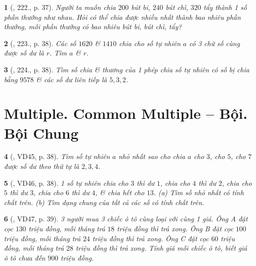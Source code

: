 \documentclass{article}
\newtheorem{baitoan}{}
\begin{document}
\begin{baitoan}[\cite{Binh_Toan_6_tap_1}, 222., p. 37]
	Người ta muốn chia $200$ bút bi, $240$ bút chì, $320$ tẩy thành 1 số phần thưởng như nhau. Hỏi có thể chia được nhiều nhất thành bao nhiêu phần thưởng, mỗi phần thưởng có bao nhiêu bút bi, bút chì, tẩy?
\end{baitoan}

\begin{baitoan}[\cite{Binh_Toan_6_tap_1}, 223., p. 38]
	Các số $1620$ \& $1410$ chia cho số tự nhiên $a$ có 3 chữ số cùng được số dư là $r$. Tìm $a$ \& $r$.
\end{baitoan}

\begin{baitoan}[\cite{Binh_Toan_6_tap_1}, 224., p. 38]
	Tìm số chia \& thương của 1 phép chia số tự nhiên có số bị chia bằng $9578$ \& các số dư liên tiếp là $5,3,2$.
\end{baitoan}


\section{Multiple. Common Multiple -- Bội. Bội Chung}

\begin{baitoan}[\cite{Binh_Toan_6_tap_1}, VD45, p. 38]
	Tìm số tự nhiên $a$ nhỏ nhất sao cho chia $a$ cho $3$, cho $5$, cho $7$ được số dư theo thứ tự là $2,3,4$.
\end{baitoan}

\begin{baitoan}[\cite{Binh_Toan_6_tap_1}, VD46, p. 38]
	1 số tự nhiên chia cho $3$ thì dư $1$, chia cho $4$ thì dư $2$, chia cho $5$ thì dư $3$, chia cho $6$ thì dư $4$, \& chia hết cho $13$. (a) Tìm số nhỏ nhất có tính chất trên. (b) Tìm dạng chung của tất cả các số có tính chất trên.
\end{baitoan}

\begin{baitoan}[\cite{Binh_Toan_6_tap_1}, VD47, p. 39]
	3 người mua 3 chiếc ô tô cùng loại với cùng 1 giá. Ông A đặt cọc $130$ triệu đồng, mỗi tháng trả $18$ triệu đồng thì trả xong. Ông B đặt cọc $100$ triệu đồng, mỗi tháng trả $24$ triệu đồng thì trả xong. Ông C đặt cọc $60$ triệu đồng, mỗi tháng trả $28$ triệu đồng thì trả xong. Tính giá mỗi chiếc ô tô, biết giá ô tô chưa đến $900$ triệu đồng.
\end{baitoan}
\end{document}
